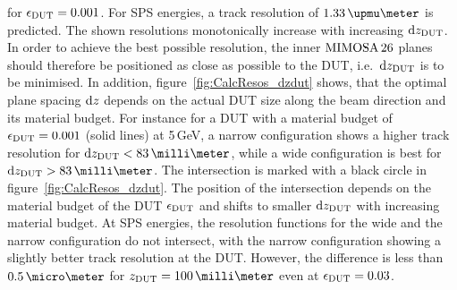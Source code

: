 \noindent
for $\mathnormal{\epsilon_{\textrm{DUT}}} = 0.001$.
For SPS energies, a track resolution of $1.33\,\upmu\meter$ is predicted.
The shown resolutions monotonically increase with increasing $\textrm{d}z_{\textrm{DUT}}$. 
In order to achieve the best possible resolution, the inner $\textrm{MIMOSA\,26}$ planes should therefore be positioned as close as possible to the DUT, i.e.~$\textrm{d}z_{\textrm{DUT}}$ is to be minimised. 
In addition, figure~\ref{fig:CalcResos_dzdut} shows, that the optimal plane spacing $\textrm{d}z$ depends on the actual DUT size along the beam direction and its material budget.
For instance for a DUT with a material budget of $\mathnormal{\epsilon_{\textrm{DUT}}} = 0.001$ (solid lines) at 5\,GeV, a narrow configuration shows a higher track resolution for $\dzdut < 83\,\milli\meter$,
 while a wide configuration is best for $\dzdut > 83\,\milli\meter$.
The intersection is marked with a black circle in figure~\ref{fig:CalcResos_dzdut}. 
The position of the intersection depends on the material budget of the DUT $\mathnormal{\epsilon_{\textrm{DUT}}}$ and shifts to smaller $\textrm{d}z_{\textrm{DUT}}$ with increasing material budget. 
At SPS energies, the resolution functions for the wide and the narrow configuration do not intersect, with the narrow configuration showing a slightly better track resolution at the DUT. 
However, the difference is less than $0.5\,\micro\meter$ for $\zdut = 100\,\milli\meter$ even at $\mathnormal{\epsilon_{\textrm{DUT}}} = 0.03$. 

% 
% 

